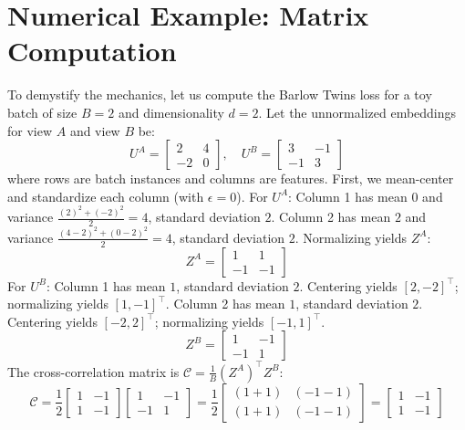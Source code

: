 \section{Numerical Example: Matrix Computation}
To demystify the mechanics, let us compute the Barlow Twins loss for a toy batch of size $B=2$ and dimensionality $d=2$. Let the unnormalized embeddings for view $A$ and view $B$ be:
\begin{equation}
    U^A = \begin{bmatrix} 2 & 4 \\ -2 & 0 \end{bmatrix}, \quad U^B = \begin{bmatrix} 3 & -1 \\ -1 & 3 \end{bmatrix}
\end{equation}
where rows are batch instances and columns are features. 
First, we mean-center and standardize each column (with $\epsilon = 0$). 
For $U^A$:
Column 1 has mean $0$ and variance $\frac{(2)^2 + (-2)^2}{2} = 4$, standard deviation $2$.
Column 2 has mean $2$ and variance $\frac{(4-2)^2 + (0-2)^2}{2} = 4$, standard deviation $2$.
Normalizing yields $Z^A$:
\begin{equation}
    Z^A = \begin{bmatrix} 1 & 1 \\ -1 & -1 \end{bmatrix}
\end{equation}
For $U^B$:
Column 1 has mean $1$, standard deviation $2$. Centering yields $[2, -2]^\top$; normalizing yields $[1, -1]^\top$.
Column 2 has mean $1$, standard deviation $2$. Centering yields $[-2, 2]^\top$; normalizing yields $[-1, 1]^\top$.
\begin{equation}
    Z^B = \begin{bmatrix} 1 & -1 \\ -1 & 1 \end{bmatrix}
\end{equation}
The cross-correlation matrix is $\mathcal{C} = \frac{1}{B} (Z^A)^\top Z^B$:
\begin{equation}
    \mathcal{C} = \frac{1}{2} \begin{bmatrix} 1 & -1 \\ 1 & -1 \end{bmatrix} \begin{bmatrix} 1 & -1 \\ -1 & 1 \end{bmatrix} = \frac{1}{2} \begin{bmatrix} (1+1) & (-1-1) \\ (1+1) & (-1-1) \end{bmatrix} = \begin{bmatrix} 1 & -1 \\ 1 & -1 \end{bmatrix}
\end{equation}
